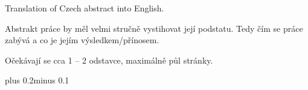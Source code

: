 \documentclass[11pt,oneside,a4paper]{book}
\begin{document}
	
	\coverpagestarts
	
	
	
	
	
	
	
	
	\abstractpage
	
	Translation of Czech abstract into English.
	
	
	\baselineskip
	
	\noindent
	Abstrakt práce by měl velmi stručně vystihovat její podstatu. Tedy čím se práce zabývá a co je jejím výsledkem/přínosem.
	
	\noindent
	Očekávají se cca 1 -- 2 odstavce, maximálně půl stránky.
	
	
	\tableofcontents
	
	
	
	\listoffigures
	
	
	
	\listoftables
	
	
	
	\mainbodystarts
	\normalfont
	\baselineskip plus 0.2\baselineskip minus 0.1\baselineskip
	
	
	
\end{document}

